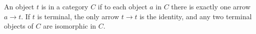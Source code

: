 An object $t$ is  in a category $C$ if to each object $a$ in $C$ there is exactly one arrow $a \rightarrow t$. If $t$ is terminal, the only arrow $t \rightarrow t$ is the identity, and any two terminal objects of $C$ are isomorphic in $C$.
